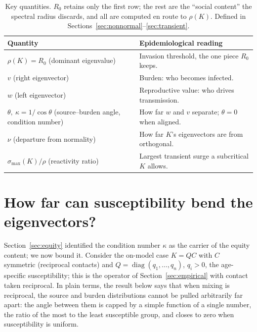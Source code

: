 \documentclass[12pt]{article}
\begin{document}
\begin{table}[h]
\centering\small
\begin{tabular}{@{}p{} p{}@{}}
\toprule
Quantity & Epidemiological reading \\
\midrule
$\rho(K)=R_0$ (dominant eigenvalue) & Invasion threshold, the one piece $R_0$ keeps. \\
$v$ (right eigenvector) & Burden: who becomes infected. \\
$w$ (left eigenvector) & Reproductive value: who drives transmission. \\
$\theta,\ \kappa=1/\cos\theta$ (source--burden angle, condition number) & How far $w$ and $v$ separate; $\theta=0$ when aligned. \\
$\nu$ (departure from normality) & How far $K$'s eigenvectors are from orthogonal. \\
$\sigma_{\max}(K)/\rho$ (reactivity ratio) & Largest transient surge a subcritical $K$ allows. \\
\bottomrule
\end{tabular}
\caption{Key quantities. $R_0$ retains only the first row; the rest are the ``social content'' the spectral radius discards, and all are computed en route to $\rho(K)$. Defined in Sections~\ref{sec:nonnormal}--\ref{sec:transient}.}
\label{tab:defs}
\end{table}

\section{How far can susceptibility bend the eigenvectors?}\label{sec:bound}

Section~\ref{sec:equity} identified the condition number $\kappa$ as the carrier of the equity content; we now bound it. Consider the on-model case $K=QC$ with $C$ symmetric (reciprocal contacts) and $Q=\operatorname{diag}(q_1,\dots,q_n)$, $q_i>0$, the age-specific susceptibility; this is the operator of Section~\ref{sec:empirical} with contact taken reciprocal. In plain terms, the result below says that when mixing is reciprocal, the source and burden distributions cannot be pulled arbitrarily far apart: the angle between them is capped by a simple function of a single number, the ratio of the most to the least susceptible group, and closes to zero when susceptibility is uniform.
\end{document}
